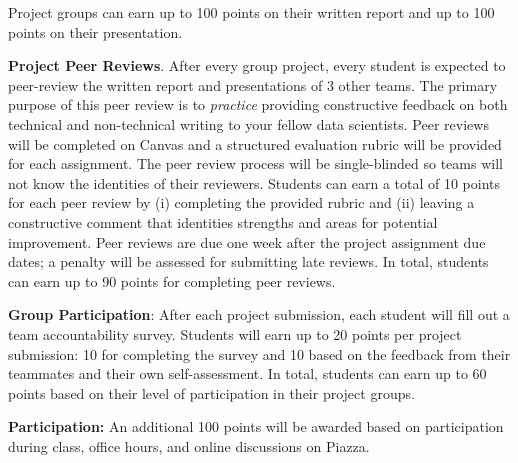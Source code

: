 \documentclass[11pt]{article}
\begin{document}
Project groups can earn up to 100 points on their written report and up to 100 points on their presentation.

\textbf{Project Peer Reviews}. After every group project, every student is expected to peer-review the written report and presentations of 3 other teams. 
The primary purpose of this peer review is to \emph{practice} providing constructive feedback on both technical and non-technical writing to your fellow data scientists.
Peer reviews will be completed on Canvas and a structured evaluation rubric will be provided for each assignment. 
The peer review process will be single-blinded so teams will not know the identities of their reviewers.
Students can earn a total of 10 points for each peer review by (i) completing the provided rubric and (ii) leaving a constructive comment that identities strengths and areas for potential improvement.
Peer reviews are due one week after the project assignment due dates; a penalty will be assessed for submitting late reviews.
In total, students can earn up to 90 points for completing peer reviews. 

\textbf{Group Participation}: After each project submission, each student will fill out a team accountability survey.
Students will earn up to 20 points per project submission: 10 for completing the survey and 10 based on the feedback from their teammates and their own self-assessment. 
In total, students can earn up to 60 points based on their level of participation in their project groups.

\textbf{Participation:} An additional 100 points will be awarded based on participation during class, office hours, and online discussions on Piazza.
\end{document}
